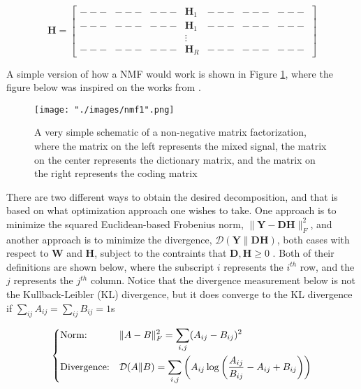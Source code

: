 \begin{equation*}
\bm{H} =
    \begin{bmatrix}
        --- & --- & --- & \bm{H}_1 & --- & --- & --- \\
        --- & --- & --- & \bm{H}_1 & --- & --- & --- \\
            &     &     & \vdots   &     &     &     \\
        --- & --- & --- & \bm{H}_R & --- & --- & --- \
    \end{bmatrix}
\end{equation*}

A simple version of how a NMF would work is shown in Figure \ref{fig::nmf_simple}, where the figure below was inspired on the works from \cite{singlechannel}.

\begin{figure}[H]
\begin{center}
    \texttt{[image: "./images/nmf1".png]}
    \caption{A very simple schematic of a non-negative matrix factorization, where the matrix on the left represents the mixed signal, the matrix on the center represents the dictionary matrix, and the matrix on the right represents the coding matrix}
    \label{fig::nmf_simple}
\end{center}
\end{figure}

There are two different ways to obtain the desired decomposition, and that is based on what optimization approach one wishes to take. One approach is to minimize the squared Euclidean-based Frobenius norm, $\| \bm{Y} - \bm{D}\bm{H} \|^2_F $, and another approach is to minimize the divergence, $\mathcal{D}(\bm{Y}\|\bm{DH})$, both cases with respect to $\bm{W}$ and $\bm{H}$, subject to the contraints that $\bm{D},\bm{H} \geq 0$ \cite{nmf2}. Both of their definitions are shown below, where the subscript $i$ represents the $i^{th}$ row, and the $j$ represents the $j^{th}$ column. Notice that the divergence measurement below is not the Kullback-Leibler (KL) divergence, but it does converge to the KL divergence if $\sum_{ij} A_{ij} = \sum_{ij} B_{ij} = 1$s

\begin{equation*}
\begin{dcases}
\text{Norm:} & \|A - B \|^2_F = \sum_{i,j} (A_{ij} - B_{ij})^2 \\
\text{Divergence:} & \mathcal{D}(A\|B) = \sum_{i,j} \left(A_{ij} \log \left( \frac{A_{ij}}{{B_{ij}}}  - A_{ij} + B_{ij} \right) \right)
\end{dcases}
\end{equation*}

